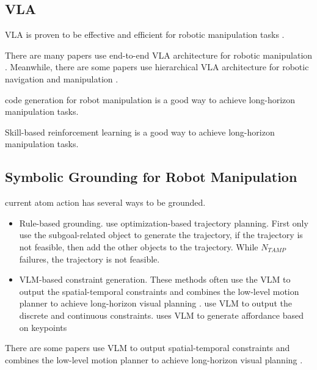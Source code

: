 \documentclass{article}
\begin{document}
\subsection{VLA}

VLA is proven to be effective and efficient for robotic manipulation tasks \cite{li2024generalist}.  

There are many papers use end-to-end VLA architecture for robotic manipulation \cite{kim2024openvla,wen2024tinyvla,zhen20243dvla}. Meanwhile, there are some papers use hierarchical VLA architecture for robotic navigation \cite{chiang2024mobility} and manipulation \cite{huang2024rekep}.

code generation for robot manipulation is a good way to achieve long-horizon manipulation tasks.\cite{mu2024robocodex}

Skill-based reinforcement learning is a good way to achieve long-horizon manipulation tasks.\cite{haresh2024clevrskills}



\subsection{Symbolic Grounding for Robot Manipulation}

current atom action has several ways to be grounded.

\begin{itemize}
    \item Rule-based grounding. \cite{yang2024guiding,yang2025octopus} use optimization-based trajectory planning. First only use the subgoal-related object to generate the trajectory, if the trajectory is not feasible, then add the other objects to the trajectory. While $N_{TAMP}$ failures, the trajectory is not feasible.
    \item VLM-based constraint generation. These methods often use the VLM to output the spatial-temporal constraints and combines the low-level motion planner to achieve long-horizon visual planning \cite{huang2024rekep}. \cite{kumar2024openworld} use VLM to output the discrete and continuous constraints. \cite{liu2024moka} uses VLM to generate affordance based on keypoints
\end{itemize}



There are some papers use VLM to output spatial-temporal constraints and combines the low-level motion planner to achieve long-horizon visual planning \cite{huang2024rekep,zhou2024codeasmonitor}.
\end{document}
